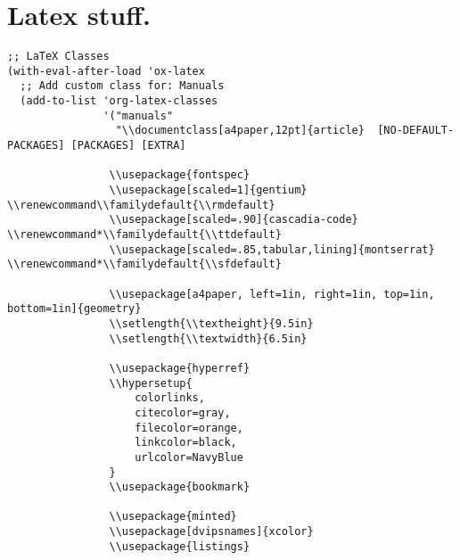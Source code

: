 \documentclass[11pt]{article}
\begin{document}
\section{Latex stuff.}
\label{sec:orgc2397b1}
\begin{verbatim}
;; LaTeX Classes
(with-eval-after-load 'ox-latex
  ;; Add custom class for: Manuals
  (add-to-list 'org-latex-classes
               '("manuals"
                 "\\documentclass[a4paper,12pt]{article}  [NO-DEFAULT-PACKAGES] [PACKAGES] [EXTRA]

                \\usepackage{fontspec}
                \\usepackage[scaled=1]{gentium} \\renewcommand\\familydefault{\\rmdefault} 
                \\usepackage[scaled=.90]{cascadia-code} \\renewcommand*\\familydefault{\\ttdefault}
                \\usepackage[scaled=.85,tabular,lining]{montserrat} \\renewcommand*\\familydefault{\\sfdefault}

                \\usepackage[a4paper, left=1in, right=1in, top=1in, bottom=1in]{geometry}
                \\setlength{\\textheight}{9.5in}
                \\setlength{\\textwidth}{6.5in}

                \\usepackage{hyperref}
                \\hypersetup{
                    colorlinks,
                    citecolor=gray,
                    filecolor=orange,
                    linkcolor=black,
                    urlcolor=NavyBlue
                }
                \\usepackage{bookmark}

                \\usepackage{minted}
                \\usepackage[dvipsnames]{xcolor}
                \\usepackage{listings}


\end{verbatim}
\end{document}

